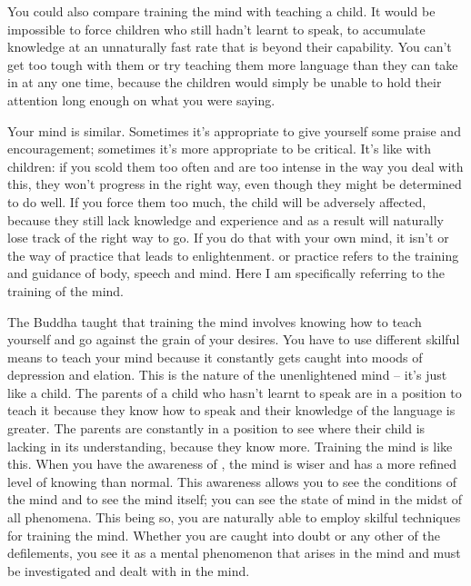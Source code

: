 You could also compare training the mind with teaching a child. It would be impossible to force children who still hadn't learnt to speak, to accumulate knowledge at an unnaturally fast rate that is beyond their capability. You can't get too tough with them or try teaching them more language than they can take in at any one time, because the children would simply be unable to hold their attention long enough on what you were saying. 

Your mind is similar. Sometimes it's appropriate to give yourself some praise and encouragement; sometimes it's more appropriate to be critical. It's like with children: if you scold them too often and are too intense in the way you deal with this, they won't progress in the right way, even though they might be determined to do well. If you force them too much, the child will be adversely affected, because they still lack knowledge and experience and as a result will naturally lose track of the right way to go. If you do that with your own mind, it isn't  or the way of practice that leads to enlightenment.  or practice refers to the training and guidance of body, speech and mind. Here I am specifically referring to the training of the mind. 

The Buddha taught that training the mind involves knowing how to teach yourself and go against the grain of your desires. You have to use different skilful means to teach your mind because it constantly gets caught into moods of depression and elation. This is the nature of the unenlightened mind -- it's just like a child. The parents of a child who hasn't learnt to speak are in a position to teach it because they know how to speak and their knowledge of the language is greater. The parents are constantly in a position to see where their child is lacking in its understanding, because they know more. Training the mind is like this. When you have the awareness of , the mind is wiser and has a more refined level of knowing than normal. This awareness allows you to see the conditions of the mind and to see the mind itself; you can see the state of mind in the midst of all phenomena. This being so, you are naturally able to employ skilful techniques for training the mind. Whether you are caught into doubt or any other of the defilements, you see it as a mental phenomenon that arises in the mind and must be investigated and dealt with in the mind. 

